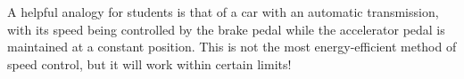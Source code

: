 A helpful analogy for students is that of a car with an automatic transmission, with its speed being controlled by the brake pedal while the accelerator pedal is maintained at a constant position.  This is not the most energy-efficient method of speed control, but it will work within certain limits!




